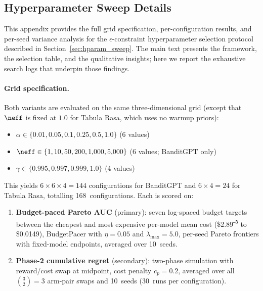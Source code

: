 
\subsection{Hyperparameter Sweep Details}
\label{app:hparam_sweep_details}

This appendix provides the full grid specification, per-configuration
results, and per-seed variance analysis for the $\epsilon$-constraint
hyperparameter selection protocol described in
Section~\ref{sec:hparam_sweep}.
The main text presents the framework, the selection table, and the
qualitative insights; here we report the exhaustive search logs that
underpin those findings.

\paragraph{Grid specification.}
Both variants are evaluated on the same three-dimensional grid
(except that $\neff$ is fixed at $1.0$ for Tabula Rasa, which uses
no warmup priors):
%
\begin{itemize}[nosep,leftmargin=*]
  \item $\alpha \in \{0.01, 0.05, 0.1, 0.25, 0.5, 1.0\}$
        \hfill (6 values)
  \item $\neff \in \{1, 10, 50, 200, 1{,}000, 5{,}000\}$
        \hfill (6 values; BanditGPT only)
  \item $\gamma \in \{0.995, 0.997, 0.999, 1.0\}$
        \hfill (4 values)
\end{itemize}
%
This yields $6 \times 6 \times 4 = 144$ configurations for BanditGPT
and $6 \times 4 = 24$ for Tabula Rasa, totalling 168~configurations.
Each is scored on:
\begin{enumerate}[nosep,leftmargin=*]
  \item \textbf{Budget-paced Pareto AUC} (primary): seven
    log-spaced budget targets between the cheapest and most expensive
    per-model mean cost (\$2.89\textsuperscript{-5} to
    \$0.0149), BudgetPacer with $\eta{=}0.05$ and
    $\lambda_{\max}{=}5.0$, per-seed Pareto frontiers with
    fixed-model endpoints, averaged over 10~seeds.
  \item \textbf{Phase-2 cumulative regret} (secondary):
    two-phase simulation with reward/cost swap at midpoint,
    cost penalty $c_p{=}0.2$, averaged over all $\binom{3}{2}{=}3$
    arm-pair swaps and 10~seeds
    (30~runs per configuration).
\end{enumerate}

